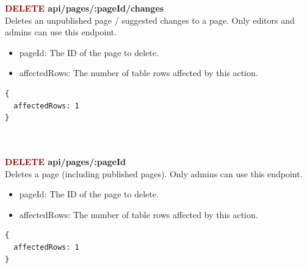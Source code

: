 \documentclass[onecolumn, draftclsnofoot,10pt, compsoc, usenames, dvipsnames]{IEEEtran}
\begin{document}
\noindent
\textbf{\textcolor{Maroon}{DELETE} api/pages/:pageId/changes} \\
Deletes an unpublished page / suggested changes to a page. Only editors and admins can use this endpoint.
\begin{itemize}
  \item pageId: The ID of the page to delete.
  \item affectedRows: The number of table rows affected by this action.
\end{itemize}
\begin{lstlisting}[caption=Example Response]
{ 
  affectedRows: 1
}
\end{lstlisting}
\\~\\


\noindent
\textbf{\textcolor{Maroon}{DELETE} api/pages/:pageId} \\
Deletes a page (including published pages). Only admins can use this endpoint.
\begin{itemize}
    \item pageId: The ID of the page to delete.
    \item affectedRows: The number of table rows affected by this action.
\end{itemize}
\begin{lstlisting}[caption=Example Response]
{ 
  affectedRows: 1
}
\end{lstlisting}
\\~\\
\end{document}
